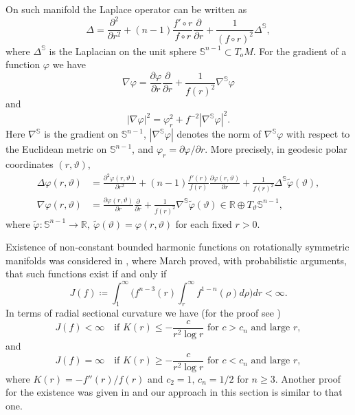 \documentclass[10pt,a4paper,reqno]{amsart}
\newcommand{\R}{\mathbb{R}}
\newcommand{\Ss}{\mathbb{S}}
\newcommand{\p}{\partial}
\numberwithin{equation}{section}
\theoremstyle{plain}
\theoremstyle{definition}
\begin{document}
On such manifold the Laplace operator can be written as
    \begin{equation}\label{laplacepolar}
     \Delta = \frac{\p^2}{\p r^2} + (n-1) \frac{f'\circ r}{f\circ r} \frac{\p}{\p r} + 
     \frac{1}{(f\circ r)^2} \Delta^{\Ss},
    \end{equation}
where $\Delta^{\Ss}$ is the Laplacian on the unit sphere $\Ss^{n-1}\subset T_oM$. For the gradient of a function $\varphi$ 
we have
    \begin{equation}\label{gradientpolar}
     \nabla \varphi = \frac{\p \varphi}{\p r} \frac{\p}{\p r} + \frac{1}{f(r)^2}\nabla^{\Ss}\varphi 
    \end{equation}
and
    \[
     |\nabla \varphi|^2 = \varphi_r^2 + f^{-2} |\nabla^{\Ss}\varphi|^2.
    \]
Here $\nabla^{\Ss}$ is the gradient on $\Ss^{n-1}$, $|\nabla^{\Ss}\varphi|$ denotes the norm of $\nabla^{\Ss}\varphi$ with respect to the Euclidean metric on $\Ss^{n-1}$,
 and $\varphi_r=\partial\varphi/\partial r$. More precisely, in geodesic polar 
coordinates $(r,\vartheta)$,
\begin{align*}
 \Delta\varphi(r,\vartheta) &= \frac{\p^2\varphi(r,\vartheta)}{\p r^2} + (n-1) \frac{f'(r)}{f(r)} \frac{\p\varphi(r,\vartheta)}{\p r} + 
     \frac{1}{f(r)^2} \Delta^{\Ss}\tilde{\varphi}(\vartheta),\\
\nabla\varphi(r,\vartheta)&=\frac{\partial\varphi(r,\vartheta)}{\partial r}\frac{\partial}{\partial r}
+\frac{1}{f(r)^2}\nabla^{\Ss}\tilde{\varphi}(\vartheta)\in \R\oplus T_{\vartheta}\Ss^{n-1},
\end{align*}
where $\tilde{\varphi}\colon\Ss^{n-1}\to\R,\ \tilde{\varphi}(\vartheta)=\varphi(r,\vartheta)$ for each fixed $r>0$.

Existence of non-constant bounded harmonic functions on rotationally symmetric manifolds was considered 
in \cite{march}, where March proved, with probabilistic arguments, that such functions exist if and only if  
    \[
     J(f)\coloneqq \int_1^\infty \Big( f^{n-3}(r)\int_r^\infty f^{1-n}(\rho) d\rho\Big)dr < \infty.
    \]
In terms of radial sectional curvature we have (for the proof see \cite{march})
    \[
J(f) < \infty \quad \text{if } K(r) \le -\frac{c}{r^2\log r} \text{ for } c>c_n \text{ and large } r,
    \]
and
    \[
     J(f) = \infty \quad \text{if } K(r) \ge -\frac{c}{r^2\log r} \text{ for } c<c_n \text{ and large } r,
    \]
where $K(r) = -f''(r)/f(r)$ and $c_2=1, \, c_n=1/2$ for $n\ge 3$.
Another proof for the existence was given in \cite{Va_lic} and our approach in this section is similar to that 
one.
\end{document}
